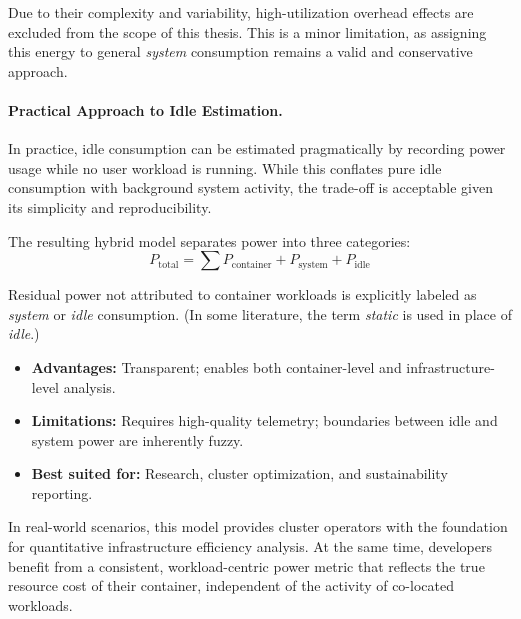 Due to their complexity and variability, high-utilization overhead effects are excluded from the scope of this thesis. This is a minor limitation, as assigning this energy to general \textit{system} consumption remains a valid and conservative approach.

\paragraph{Practical Approach to Idle Estimation.} 
In practice, idle consumption can be estimated pragmatically by recording power usage while no user workload is running. While this conflates pure idle consumption with background system activity, the trade-off is acceptable given its simplicity and reproducibility.

The resulting hybrid model separates power into three categories:
\begin{equation}
    P_\text{total} = \sum P_\text{container} + P_\text{system} + P_\text{idle}
\end{equation}

Residual power not attributed to container workloads is explicitly labeled as \textit{system} or \textit{idle} consumption. (In some literature, the term \textit{static} is used in place of \textit{idle}.)

\begin{itemize}
    \item \textbf{Advantages:} Transparent; enables both container-level and infrastructure-level analysis.
    \item \textbf{Limitations:} Requires high-quality telemetry; boundaries between idle and system power are inherently fuzzy.
    \item \textbf{Best suited for:} Research, cluster optimization, and sustainability reporting.
\end{itemize}

In real-world scenarios, this model provides cluster operators with the foundation for quantitative infrastructure efficiency analysis. At the same time, developers benefit from a consistent, workload-centric power metric that reflects the true resource cost of their container, independent of the activity of co-located workloads.






